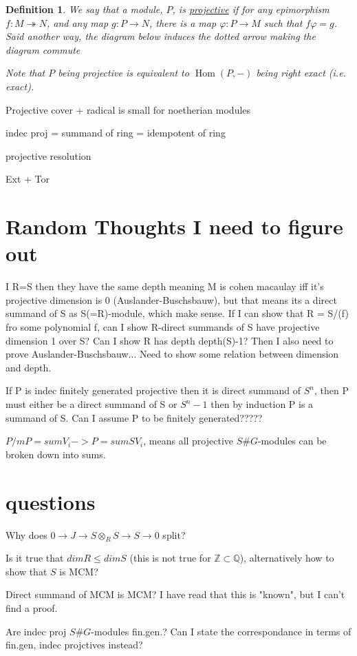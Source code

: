 \documentclass[11pt, a4paper, english]{article}
\numberwithin{prop}{section}
\numberwithin{lemma}{section}
\numberwithin{theorem}{section}
\newtheorem{defin}{Definition}
\numberwithin{defin}{section}
\numberwithin{example}{section}
\DeclareMathOperator{\Hom}{Hom}
\begin{document}
\begin{appendices}
\begin{defin}
We say that a module, $P$, is \underline{projective} if for any epimorphism $f: M \twoheadrightarrow N$, and any map $g: P \to N$, there is a map $\varphi: P \to M$ such that $f \varphi = g$. Said another way, the diagram below induces the dotted arrow making the diagram commute
\begin{center}
\end{center} 
Note that $P$ being projective is equivalent to $\Hom(P, -)$ being right exact (i.e. exact).
\end{defin}

Projective cover + radical is  small for noetherian modules

indec proj = summand of ring = idempotent of ring

projective resolution

Ext + Tor
\end{appendices}

\section{Random Thoughts I need to figure out}
I R=S then they have the same depth meaning M is cohen macaulay iff it's projective dimension is 0 (Auslander-Buschsbauw), but that means its a direct summand of S as S(=R)-module, which make sense. If I can show that R = S/(f) fro some polynomial f, can I show R-direct summands of S have projective dimension 1 over S? Can I show R has depth depth(S)-1? Then I also need to prove Auslander-Buschsbauw... Need to show some relation between dimension and depth.

If P is indec finitely generated projective then it is direct summand of $S^n$, then P must either be a direct summand of S or $S^n-1$ then by induction P is a  summand of S. Can I assume P to be finitely generated?????

$P/mP = sum V_i -> P = sum SV_i$, means  all projective $S\#G$-modules can be broken down into sums.

\section{questions}
Why does $0 \to J \to S \otimes_R S \to S \to 0$ split?

Is it true that $dim R \leq dim S$ (this is not true for $\mathbb{Z} \subset \mathbb{Q}$), alternatively how to show that $S$ is MCM?

Direct summand of MCM is MCM? I have read that this is "known", but I can't find a proof.

Are indec proj $S\#G$-modules fin.gen.? Can I state the correspondance in terms of fin.gen, indec projctives instead?

\nocite{*}


\end{document}
